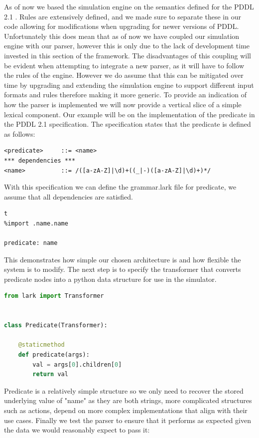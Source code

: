 As of now we based the simulation engine on the semantics defined for the PDDL 2.1 \cite{pddl21:online}.
Rules are extensively defined, and we made sure to separate these in our code allowing for modifications when upgrading for newer versions of PDDL.
Unfortunately this does mean that as of now we have coupled our simulation engine with our parser, however this is only due to the lack of development time invested in this section of the framework.
The disadvantages of this coupling will be evident when attempting to integrate a new parser, as it will have to follow the rules of the engine.
However we do assume that this can be mitigated over time by upgrading and extending the simulation engine to support different input formats and rules therefore making it more generic.
\newpage
To provide an indication of how the parser is implemented we will now provide a vertical slice of a simple lexical component.
Our example will be on the implementation of the predicate in the PDDL 2.1 specification.
The specification states that the predicate is defined as follows:
\begin{lstlisting}
<predicate>     ::= <name>
*** dependencies ***
<name>          ::= /([a-zA-Z]|\d)+((_|-)([a-zA-Z]|\d)+)*/
\end{lstlisting}
With this specification we can define the grammar.lark file for predicate, we assume that all dependencies are satisfied.

\begin{lstlisting}t
%import .name.name

predicate: name
\end{lstlisting}
This demonstrates how simple our chosen architecture is and how flexible the system is to modify. The next step is to specify the transformer that converts predicate nodes into a python data structure for use in the simulator.

\begin{lstlisting}[language=Python]
from lark import Transformer


class Predicate(Transformer):

    @staticmethod
    def predicate(args):
        val = args[0].children[0]
        return val

\end{lstlisting}
Predicate is a relatively simple structure so we only need to recover the stored underlying value of "name" as they are both strings, more complicated structures such as actions, depend on more complex implementations that align with their use cases.
Finally we test the parser to ensure that it performs as expected given the data we would reasonably expect to pass it:


